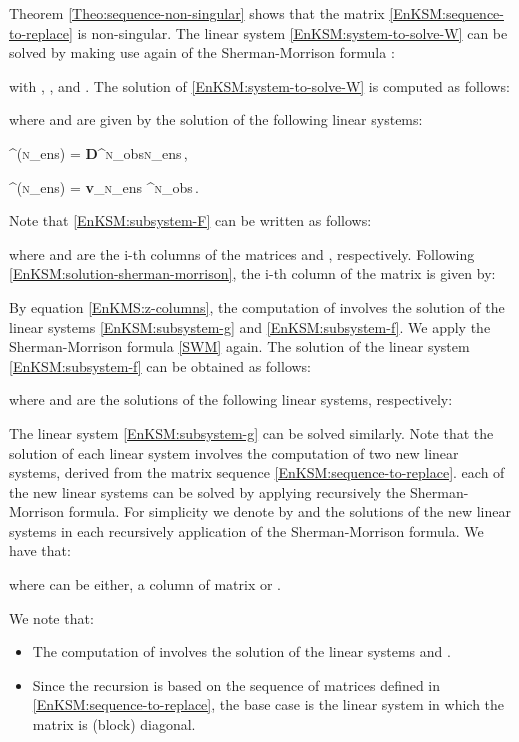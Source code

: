 \documentclass[12pt]{article}
\newcommand{\Nobs}{\textsc{n}_{{\rm obs}}}
\newcommand{\Nens}{\textsc{n}_{{\rm ens}}}
\newcommand{\D}{{\bf D}}
\newcommand{\W}[1]{{{\bf W}^{\left ( {\rm #1} \right )}}}
\renewcommand{\v}[1]{{\bf v}_{{\rm #1}}}
\renewcommand{\Re}{\mathbbm{R}}
\newcommand{\F}[1]{{\bf F}^{\left({\rm #1}\right)}}
\newcommand{\g}[1]{{\bf g}^{\left({\rm #1}\right)}}
\begin{document}
Theorem \ref{Theo:sequence-non-singular} shows that the matrix \eqref{EnKSM:sequence-to-replace} is non-singular. The linear system \eqref{EnKSM:system-to-solve-W} can be solved by making use again of the Sherman-Morrison formula \cite{Sher89}:

with , ,  and . The solution of \eqref{EnKSM:system-to-solve-W} is computed as follows:

where  and  are given by the solution of the following linear systems:

\label{EnKSM:subsystem-F}
\displaystyle \W{\Nens-1} \cdot \F{\Nens} = \D \in \Re^{\Nobs \times \Nens}\,,

\label{EnKSM:subsystem-g}
\displaystyle \W{\Nens-1} \cdot \g{\Nens} = \v{\Nens} \in \Re^{\Nobs {}}\,.

Note that \eqref{EnKSM:subsystem-F} can be written as follows:

where  and  are the i-th columns of the matrices  and , respectively. Following \eqref{EnKSM:solution-sherman-morrison}, the i-th column of the matrix  is given by:


By equation \eqref{EnKMS:z-columns}, the computation of  involves the solution of the linear systems \eqref{EnKSM:subsystem-g} and \eqref{EnKSM:subsystem-f}. We apply the Sherman-Morrison formula  \eqref{SWM} again. The solution of the linear system \eqref{EnKSM:subsystem-f} can be obtained as follows:

where  and  are the solutions of the following linear systems, respectively:


The linear system \eqref{EnKSM:subsystem-g} can be solved similarly. Note that the solution of each linear system involves the computation of two new linear systems, derived from the matrix sequence  \eqref{EnKSM:sequence-to-replace}. each of the new linear systems can be solved by applying recursively the Sherman-Morrison formula. For simplicity we denote by  and  the solutions of the new linear systems in each recursively application of the Sherman-Morrison formula. We have that:
{\allowdisplaybreaks

}
where  can be either, a column of matrix  or . 

We note that:
\begin{itemize}
\item The computation of  involves the solution of the linear systems  and .
\item Since the recursion is based on the sequence of matrices defined in \eqref{EnKSM:sequence-to-replace}, the base case is the linear system  in which the matrix  is (block) diagonal.
\end{itemize}
\end{document}
